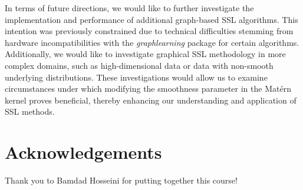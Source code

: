 \documentclass[11pt]{amsart}
\begin{document}
In terms of future directions, we would like to further investigate the implementation and performance of additional graph-based SSL algorithms. This intention was previously constrained due to technical difficulties stemming from hardware incompatibilities with the \textit{graphlearning} package for certain algorithms. Additionally, we would like to investigate graphical SSL methodology in more complex domains, such as high-dimensional data or data with non-smooth underlying distributions. These investigations would allow us to examine circumstances under which modifying the smoothness parameter in the Matérn kernel proves beneficial, thereby enhancing our understanding and application of SSL methods.

\section*{Acknowledgements}
Thank you to Bamdad Hosseini for putting together this course!


\end{document}
